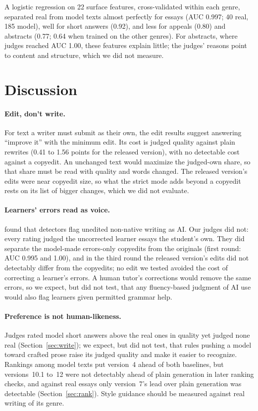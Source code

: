 \documentclass[11pt]{article}
\begin{document}
A logistic regression on 22 surface features, cross-validated within each genre, separated real from model texts almost perfectly for essays (AUC 0.997; 40 real, 185 model), well for short answers (0.92), and less for appeals (0.80) and abstracts (0.77; 0.64 when trained on the other genres). For abstracts, where judges reached AUC 1.00, these features explain little; the judges' reasons point to content and structure, which we did not measure.

\section{Discussion}

\paragraph{Edit, don't write.} For text a writer must submit as their own, the edit results suggest answering ``improve it'' with the minimum edit. Its cost is judged quality against plain rewrites (0.41 to 1.56 points for the released version), with no detectable cost against a copyedit. An unchanged text would maximize the judged-own share, so that share must be read with quality and words changed. The released version's edits were near copyedit size, so what the strict mode adds beyond a copyedit rests on its list of bigger changes, which we did not evaluate.

\paragraph{Learners' errors read as voice.} \citet{liang2023biased} found that detectors flag unedited non-native writing as AI. Our judges did not: every rating judged the uncorrected learner essays the student's own. They did separate the model-made errors-only copyedits from the originals (first round: AUC 0.995 and 1.00), and in the third round the released version's edits did not detectably differ from the copyedits; no edit we tested avoided the cost of correcting a learner's errors. A human tutor's corrections would remove the same errors, so we expect, but did not test, that any fluency-based judgment of AI use would also flag learners given permitted grammar help.

\paragraph{Preference is not human-likeness.} Judges rated model short answers above the real ones in quality yet judged none real (Section~\ref{sec:write}); we expect, but did not test, that rules pushing a model toward crafted prose raise its judged quality and make it easier to recognize. Rankings among model texts put version~4 ahead of both baselines, but versions~10.1 to~12 were not detectably ahead of plain generation in later ranking checks, and against real essays only version~7's lead over plain generation was detectable (Section~\ref{sec:rank}). Style guidance should be measured against real writing of its genre.
\end{document}
